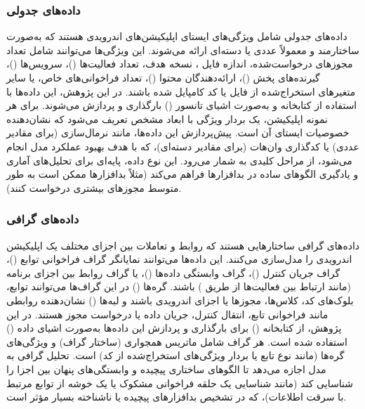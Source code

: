 \subsubsection{داده‌های جدولی}
داده‌های جدولی شامل ویژگی‌های ایستای اپلیکیشن‌های اندرویدی هستند که به‌صورت ساختارمند و معمولاً عددی یا دسته‌ای ارائه می‌شوند. این ویژگی‌ها می‌توانند شامل تعداد مجوزهای درخواست‌شده، اندازه فایل ، نسخه  هدف، تعداد فعالیت‌ها ()، سرویس‌ها ()، گیرنده‌های پخش ()، ارائه‌دهندگان محتوا ()، تعداد فراخوانی‌های  خاص، یا سایر متغیرهای استخراج‌شده از فایل  یا کد کامپایل شده باشند. در این پژوهش، این داده‌ها با استفاده از کتابخانه  و به‌صورت اشیای تانسور () بارگذاری و پردازش می‌شوند. برای هر نمونه اپلیکیشن، یک بردار ویژگی با ابعاد مشخص تعریف می‌شود که نشان‌دهنده خصوصیات ایستای آن است. پیش‌پردازش این داده‌ها، مانند نرمال‌سازی (برای مقادیر عددی) یا کدگذاری وان‌هات (برای مقادیر دسته‌ای)، که با هدف بهبود عملکرد مدل انجام می‌شود، از مراحل کلیدی به شمار می‌رود. این نوع داده، پایه‌ای برای تحلیل‌های آماری و یادگیری الگوهای ساده در بدافزارها فراهم می‌کند (مثلاً بدافزارها ممکن است به طور متوسط مجوزهای بیشتری درخواست کنند).

\subsubsection{داده‌های گرافی}
داده‌های گرافی ساختارهایی هستند که روابط و تعاملات بین اجزای مختلف یک اپلیکیشن اندرویدی را مدل‌سازی می‌کنند. این داده‌ها می‌توانند نمایانگر گراف فراخوانی توابع ()، گراف جریان کنترل ()، گراف وابستگی داده‌ها ()، یا گراف روابط بین اجزای برنامه (مانند ارتباط بین فعالیت‌ها از طریق ) باشند. گره‌ها () در این گراف‌ها می‌توانند توابع، بلوک‌های کد، کلاس‌ها، مجوزها یا اجزای اندرویدی باشند و لبه‌ها () نشان‌دهنده روابطی مانند فراخوانی تابع، انتقال کنترل، جریان داده یا درخواست مجوز هستند. در این پژوهش، از کتابخانه  () برای بارگذاری و پردازش این داده‌ها به‌صورت اشیای داده () استفاده شده است. هر گراف شامل ماتریس همجواری (ساختار گراف) و ویژگی‌های گره‌ها (مانند نوع تابع یا بردار ویژگی‌های استخراج‌شده از کد) است. تحلیل گرافی به مدل اجازه می‌دهد تا الگوهای ساختاری پیچیده و وابستگی‌های پنهان بین اجزا را شناسایی کند (مانند شناسایی یک حلقه فراخوانی مشکوک یا یک خوشه از توابع مرتبط با سرقت اطلاعات)، که در تشخیص بدافزارهای پیچیده یا ناشناخته بسیار مؤثر است.

